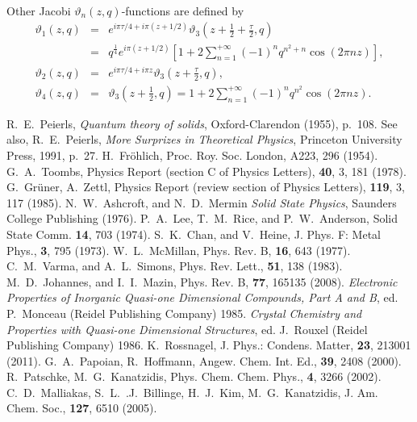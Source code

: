 \documentclass[]{revtex4-1}
\begin{document}
Other Jacobi $\vartheta_n(z,q)$-functions are defined by 
\begin{eqnarray}
  \vartheta_1(z,q)&=&  e^{i\pi \tau/4+i \pi (z+1/2)} \vartheta_3(z+\frac{1}{2}+\frac{\tau}{2},q) \nonumber \\ &=& q^{\frac{1}{4}} e^{i \pi (z+1/2)} [1 + 2\sum_{n=1}^{+\infty} (-1)^n q^{n^2+n} \cos(2\pi n z)],   \\
  \vartheta_2(z,q)&=&  e^{i\pi \tau/4+i \pi z} \vartheta_3(z+ \frac{\tau}{2},q),  \\
  \vartheta_4(z,q)&=&   \vartheta_3(z+\frac{1}{2},q)=1 + 2\sum_{n=1}^{+\infty} (-1)^n q^{n^2} \cos(2\pi n z). 
  \end{eqnarray}


\begin{thebibliography}{99}
 R.~E.~Peierls, \textit{Quantum theory of solids}, Oxford-Clarendon (1955), p.~108. See also, R.~E.~Peierls, \textit{More Surprizes in Theoretical Physics}, Princeton University Press, 1991, p.~27.
 H.~Fr\"ohlich, Proc. Roy. Soc. London, A223, 296 (1954).
 G.~A.~Toombs, Physics Report (section C of Physics Letters), \textbf{40}, 3, 181 (1978).
 G.~Gr\"uner, A.~Zettl, Physics Report (review section of Physics Letters), \textbf{119}, 3, 117 (1985).
 N.~W.~Ashcroft, and N.~D.~Mermin \textit{Solid State Physics}, Saunders College Publishing (1976).
 P.~A.~Lee, T.~M.~Rice, and P.~W.~Anderson, Solid State Comm. \textbf{14}, 703 (1974).
 S.~K.~Chan, and V.~Heine, J. Phys. F: Metal Phys., \textbf{3}, 795 (1973).
 W.~L.~McMillan, Phys. Rev. B, \textbf{16}, 643 (1977).
 C.~M.~Varma, and A.~L.~Simons, Phys. Rev. Lett., \textbf{51}, 138 (1983).
 M.~D.~Johannes, and I.~I.~Mazin, Phys. Rev. B, \textbf{77}, 165135 (2008).
 \textit{Electronic Properties of Inorganic Quasi-one Dimensional Compounds, Part A and B}, ed. P.~Monceau (Reidel Publishing Company) 1985.
 \textit{Crystal Chemistry and Properties with Quasi-one Dimensional Structures}, ed. J.~Rouxel (Reidel Publishing Company) 1986.
 K.~Rossnagel, J. Phys.: Condens. Matter, \textbf{23}, 213001 (2011).
 G.~A.~Papoian, R.~Hoffmann, Angew. Chem. Int. Ed., \textbf{39}, 2408 (2000).
 R.~Patschke, M.~G.~Kanatzidis, Phys. Chem. Chem. Phys., \textbf{4}, 3266 (2002).
 C.~D.~Malliakas, S.~L.~.J.~Billinge, H.~J.~Kim, M.~G.~Kanatzidis, J. Am. Chem. Soc., \textbf{127}, 6510 (2005).

\end{thebibliography}
\end{document}
